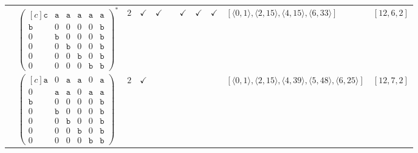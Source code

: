 \documentclass[12pt]{article}
\theoremstyle{definition}
\theoremstyle{plain}
\begin{document}
{\begin{longtable}{@{}cYcccccccZc@{}}
\cmidrule(lr){2-11}


& $\begin{pmatrix*}[c]
\mathtt{c}  &  \mathtt{a}  &  \mathtt{a}  &  \mathtt{a}  &  \mathtt{a}  &  \mathtt{a}  \\
\mathtt{b}  &  0  &  0  &  0  &  0  &  \mathtt{b}  \\
0  &  \mathtt{b}  &  0  &  0  &  0  &  \mathtt{b}  \\
0  &  0  &  \mathtt{b}  &  0  &  0  & \mathtt{b}   \\
0  &  0  &  0  &  \mathtt{b}  &  0   &  \mathtt{b}  \\
0  &  0  &  0  &  0  &  \mathtt{b}   &  \mathtt{b}
\end{pmatrix*}^*$
& $2$
& $\checkmark$
& $\checkmark$
&
& $\checkmark$
& $\checkmark$
& $\checkmark$
& $[\langle0,1\rangle,\allowbreak\langle2,15\rangle,\allowbreak\langle4,15\rangle,\allowbreak\langle6,33\rangle]$
& $[12,6,2]$     \\

\cmidrule(lr){2-11}


& $\begin{pmatrix*}[c]
\mathtt{a}  &  0  &  \mathtt{a}  &  \mathtt{a}  &  0  &  \mathtt{a}  \\
0  &  \mathtt{a}  &  \mathtt{a}  &  0  &  \mathtt{a}  &  \mathtt{a}  \\
\mathtt{b}  &  0  &  0  &  0  &  0  &  \mathtt{b}  \\
0  &  \mathtt{b}  &  0  &  0  &  0  &  \mathtt{b}  \\
0  &  0  &  \mathtt{b}  &  0  &  0  & \mathtt{b}   \\
0  &  0  &  0  &  \mathtt{b}  &  0   &  \mathtt{b}  \\
0  &  0  &  0  &  0  &  \mathtt{b}   &  \mathtt{b}
\end{pmatrix*}$
& $2$
& $\checkmark$
&
&
&
&
&
& $[\langle0,1\rangle,\allowbreak\langle2,15\rangle,\allowbreak\langle4,39\rangle,\allowbreak\langle5,48\rangle,\allowbreak\langle6,25\rangle]$
& $[12,7,2]$     \\

\cmidrule(lr){2-11}


\end{longtable}}
\end{document}

